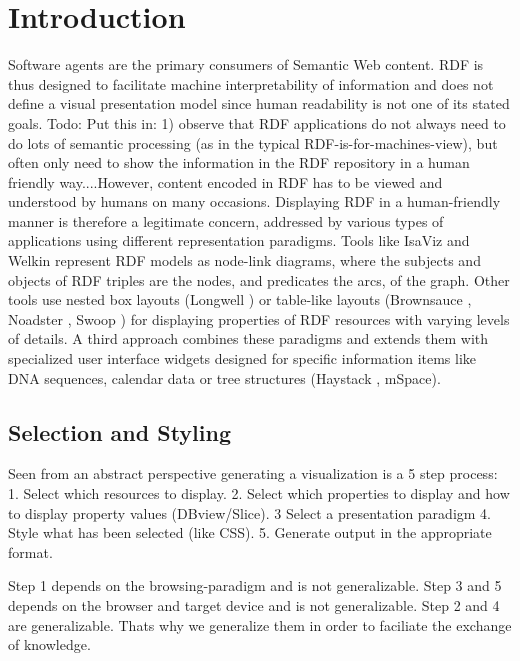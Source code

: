 \section{Introduction}

Software agents are the primary consumers of Semantic Web content. RDF is thus designed to facilitate machine interpretability of information and does not define a visual presentation model since human readability is not one of its stated goals. Todo: Put this in: 1) observe that RDF applications do not always need to do lots of semantic processing (as in the typical RDF-is-for-machines-view), but often only need to show the information in the RDF repository in a human friendly way....However, content encoded in RDF has to be viewed and understood by humans on many occasions. Displaying RDF in a human-friendly manner is therefore a legitimate concern, addressed by various types of applications using different representation paradigms. Tools like IsaViz \cite{isaviz}and Welkin \cite{Welkin} represent RDF models as node-link diagrams, where the subjects and objects of RDF triples are the nodes, and predicates the arcs, of the graph. Other tools use nested box layouts (Longwell \cite{simile}) or table-like layouts (Brownsauce \cite{Steer03}, Noadster \cite{Rutledge05}, Swoop \cite{MindSwap05}) for displaying properties of RDF resources with varying levels of details. A third approach combines these paradigms and extends them with specialized user interface widgets designed for specific information items like DNA sequences, calendar data or tree structures (Haystack \cite{Quan04}, mSpace\cite{mspace2005}).


\subsection{Selection and Styling}

Seen from an abstract perspective  generating a visualization is a 5 step process:
1. Select which resources to display.
2. Select which properties to display and how to display property values (DBview/Slice).
3  Select a presentation paradigm
4. Style what has been selected (like CSS).
5. Generate output in the appropriate format.

Step 1 depends on the browsing-paradigm and is not generalizable.
Step 3 and 5 depends on the browser and target device and is not generalizable.
Step 2 and 4 are generalizable. Thats why we generalize them in order to faciliate the exchange of knowledge.

